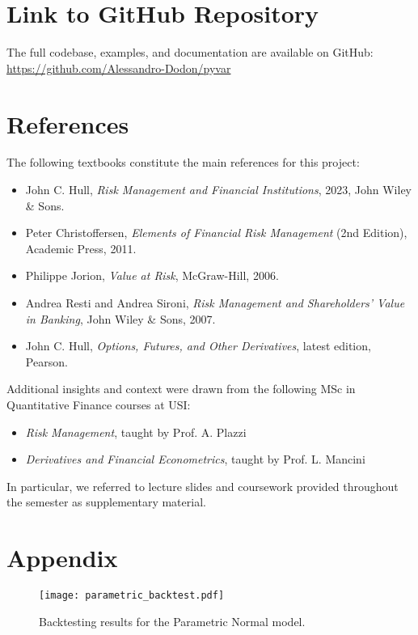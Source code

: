 \documentclass{article}
\begin{document}
\section{Link to GitHub Repository}

The full codebase, examples, and documentation are available on GitHub:  
\url{https://github.com/Alessandro-Dodon/pyvar}

\section{References}

The following textbooks constitute the main references for this project:

\begin{itemize}
  \item John C. Hull, \textit{Risk Management and Financial Institutions}, 2023, John Wiley \& Sons.
  \item Peter Christoffersen, \textit{Elements of Financial Risk Management} (2nd Edition), Academic Press, 2011.
  \item Philippe Jorion, \textit{Value at Risk}, McGraw-Hill, 2006.
  \item Andrea Resti and Andrea Sironi, \textit{Risk Management and Shareholders’ Value in Banking}, John Wiley \& Sons, 2007.
  \item John C. Hull, \textit{Options, Futures, and Other Derivatives}, latest edition, Pearson.
\end{itemize}

\vspace{1em}

Additional insights and context were drawn from the following MSc in Quantitative Finance courses at USI:

\begin{itemize}
  \item \textit{Risk Management}, taught by Prof. A. Plazzi
  \item \textit{Derivatives and Financial Econometrics}, taught by Prof. L. Mancini
\end{itemize}

In particular, we referred to lecture slides and coursework provided throughout the semester as supplementary material.


\section{Appendix}

\begin{figure}[H]
    \centering
    \begin{minipage}{0.95\textwidth}
        \centering
        \texttt{[image: parametric\_backtest.pdf]}
        \caption{Backtesting results for the Parametric Normal model.}
    \end{minipage}
\end{figure}
\end{document}
